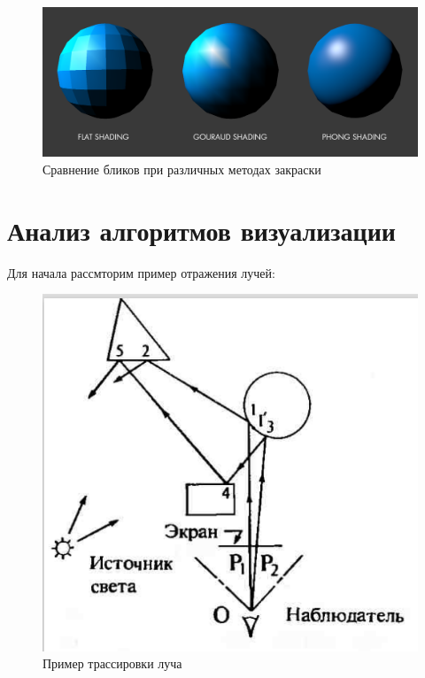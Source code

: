 \documentclass[a4paper,14pt, unknownkeysallowed]{extreport}
\begin{document}
\begin{figure}[H]
	\centering
	\includegraphics[scale=0.3]{reflexion_shading_compare}
	\caption{Сравнение бликов при различных методах закраски}
	\label{fig:reflexion_shading_compare}
\end{figure}






\section[Анализ алгоритмов создания отражений]{Анализ алгоритмов визуализации}

Для начала рассмторим пример отражения лучей:

\begin{figure}[H]
	\centering
	\includegraphics{global_model_light.png}
	\caption{Пример трассировки луча}
	\label{fig:global_model_light}
\end{figure} 
\end{document}
